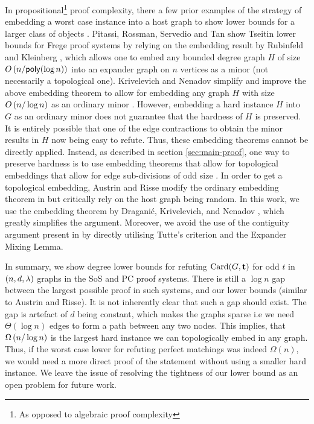 \documentclass[11pt]{article}
\begin{document}
In propositional\footnote{As opposed to algebraic proof complexity} proof complexity, there a few prior examples of the strategy of embedding a worst case instance into a host graph to show lower bounds for a larger class of objects \cite{itsykson2021Near, pitassi2016PolyLogFrege}.
Pitassi, Rossman, Servedio and Tan show Tseitin lower bounds for Frege proof systems \citep{pitassi2016PolyLogFrege} by relying on the embedding result by Rubinfeld and Kleinberg \citep{kleinberg1996short}, which allows one to embed any bounded degree graph $H$ of size $O\left(n/\mathsf{poly}(\log n)\right)$ into an expander graph on $n$ vertices as a minor (not necessarily a topological one). 
Krivelevich and Nenadov simplify and improve the above embedding theorem to allow for embedding any graph $H$ with size $O\left(n/\log n\right)$ as an ordinary minor \citep{krivelevich2021completeMinors}.
However, embedding a hard instance $H$ into $G$ as an ordinary minor does not guarantee that the hardness of $H$ is preserved.
It is entirely possible that one of the edge contractions to obtain the minor results in $H$ now being easy to refute.
Thus, these embedding theorems cannot be directly applied.
Instead, as described in section \ref{sec:main-proof}, one way to preserve hardness is to use  embedding theorems that allow for topological embeddings that allow for edge sub-divisions of odd size \citep{draganic22rolling, nenadov2023routing}.
In order to get a topological embedding, Austrin and Risse modify the ordinary embedding theorem in \citep{krivelevich2021completeMinors} but critically rely on the host graph being random.
In this work, we use the embedding theorem by Dragani\'c, Krivelevich, and Nenadov \cite{draganic22rolling}, which greatly simplifies the argument. Moreover, we avoid the use of the contiguity argument present in \cite{Austrin_2022} by directly utilising Tutte's criterion and the Expander Mixing Lemma.

\par
In summary, we show degree lower bounds for refuting $\text{Card}(G, \mathbf{t})$ for odd $t$ in $(n, d, \lambda)$ graphs in the SoS and PC proof systems.
There is still a $\log n$ gap between the largest possible proof in such systems, and our lower bounds (similar to Austrin and Risse).
It is not inherently clear that such a gap should exist.
The gap is artefact of $d$ being constant, which makes the graphs sparse i.e we need $\Theta(\log n)$ edges to form a path between any two nodes.
This implies, that $\Omega\left(n/\log n\right)$ is the largest hard instance we can topologically embed in any graph.
Thus, if the worst case lower for refuting perfect matchings was indeed $\Omega(n)$, we would need a more direct proof of the statement without using a smaller hard instance.
We leave the issue of resolving the tightness of our lower bound as an open problem for future work.



\clearpage
\appendix
\end{document}
